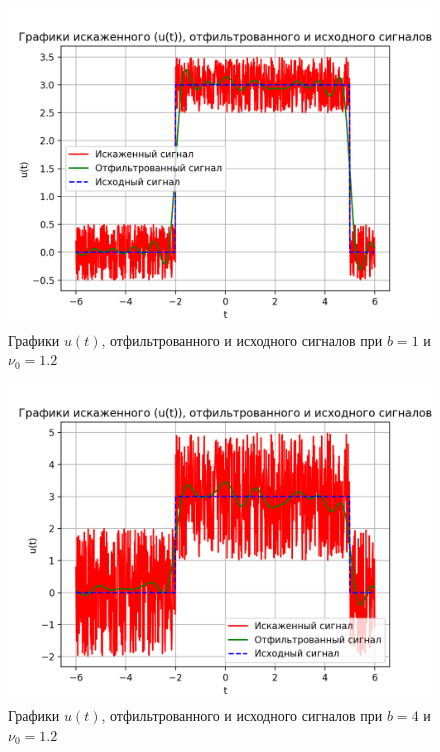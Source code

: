 \begin{figure}[ht!]
    \centering
    \includegraphics[scale=0.85]{media/1 task/high_freq/Cleaned_1_-1,1981981981981982.png}
    \caption{Графики  $u(t)$, отфильтрованного и исходного сигналов при $b=1$ и $\nu_0=1.2$}
    \label{fig:cleaned_1_12}
\end{figure}

\begin{figure}[ht!]
    \centering
    \includegraphics[scale=0.85]{media/1 task/high_freq/Cleaned_4_-1,1981981981981982.png}
    \caption{Графики  $u(t)$, отфильтрованного и исходного сигналов при $b=4$ и $\nu_0=1.2$}
    \label{fig:cleaned_4_12}
\end{figure}

